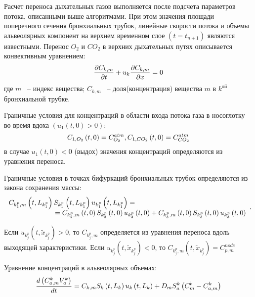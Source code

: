 Расчет переноса дыхательных газов выполняется после подсчета параметров потока, описанными выше алгоритмами. При этом значения площади поперечного сечения бронхиальных трубок, линейные скорости потока и объемы альвеолярных компонент на верхнем временном слое $\left(t=t_{n+1} \right)$ являются известными. 
Перенос $O_{2}$ и $CO_{2}$ в верхних дыхательных путях описывается конвективным уравнением: 
\begin{equation}\label{GrindEQ__19_}
\frac{\partial C_{k,m} }{\partial t} +u_{k} \frac{\partial C_{k,m} }{\partial x} =0\notag 
\end{equation} 
где $m$ ~-- индекс вещества; $C_{k,m} $ ~-- доля(концентрация) вещества $m$ в $k^{ой} $ бронхиальной трубке.

Граничные условия для концентраций  в области входа потока газа в носоглотку во время вдоха $\left(u_{1} \left(t,0\right)>0\right)$: 
\begin{equation} 
C_{1,O_{2} } \left(t,0\right)=C_{O_{2} }^{atm} , C_{1,CO_{2} } \left(t,0\right)=C_{CO_{2} }^{atm} \notag
\end{equation} 
в случае $u_{1} \left(t,0\right)<0$ (выдох) значения концентраций определяются из уравнения переноса.

Граничные условия в точках бифуркаций бронхиальных трубок определяются из закона сохранения массы:
\begin{equation} 
\begin{array}{l} {C_{k_{1}^{p} ,m} \left(t,L_{k_{1}^{p} } \right)S_{k_{1}^{p} } \left(t,L_{k_{1}^{p} } \right)u_{k_{1}^{p} } \left(t,L_{k_{1}^{p} } \right)=} \\ {\; \; \; \; \; \; \; \; \; \; \; \; \; \; \; \; \; \; \; \; \; \; \; \; =C_{k_{2}^{p} ,m} \left(t,0\right)S_{k_{2}^{p} } \left(t,0\right)u_{k_{2}^{p} } \left(t,0\right)+C_{k_{3}^{p} ,m} \left(t,0\right)S_{k_{3}^{p} } \left(t,0\right)u_{k_{3}^{p} } \left(t,0\right)} \end{array}.  \notag 
\end{equation} 

Если $u_{k_{j}^{p} } \left(t,\tilde{x}_{k_{j}^{p} } \right)>0$, то $C_{k_{j}^{p} ,m} $ определяется из уравнения переноса вдоль выходящей характеристики. Если $u_{k_{j}^{p} } \left(t,\tilde{x}_{k_{j}^{p} } \right)<0$, то $ C_{k_{j}^{p} ,m} \left(t,\tilde{x}_{k_{j}^{p} } \right)=C_{p,m}^{node}$ 

Уравнение концентраций в альвеолярных объемах:
\begin{equation}  
\frac{d\left(C_{a,m}^{k} V_{a}^{k} \right)}{dt} =C_{k,m} S_{k} \left(t,L_{k} \right)u_{k} \left(t,L_{k} \right)+D_{m} S_{a}^{k} \left(C_{m}^{b} -C_{a,m}^{k} \right)\notag  
\end{equation} 


